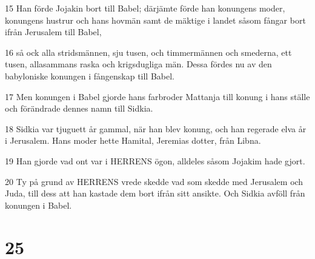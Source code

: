 \par 15 Han förde Jojakin bort till Babel; därjämte förde han konungens moder, konungens hustrur och hans hovmän samt de mäktige i landet såsom fångar bort ifrån Jerusalem till Babel,
\par 16 så ock alla stridsmännen, sju tusen, och timmermännen och smederna, ett tusen, allasammans raska och krigsdugliga män. Dessa fördes nu av den babyloniske konungen i fångenskap till Babel.
\par 17 Men konungen i Babel gjorde hans farbroder Mattanja till konung i hans ställe och förändrade dennes namn till Sidkia.
\par 18 Sidkia var tjuguett år gammal, när han blev konung, och han regerade elva år i Jerusalem. Hans moder hette Hamital, Jeremias dotter, från Libna.
\par 19 Han gjorde vad ont var i HERRENS ögon, alldeles såsom Jojakim hade gjort.
\par 20 Ty på grund av HERRENS vrede skedde vad som skedde med Jerusalem och Juda, till dess att han kastade dem bort ifrån sitt ansikte. Och Sidkia avföll från konungen i Babel.

\chapter{25}


